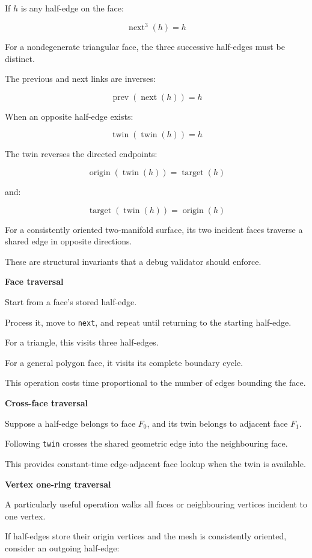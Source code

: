 If \(h\) is any half-edge on the face:

\[
\boxed{ \operatorname{next}^3(h)=h }
\]

For a nondegenerate triangular face, the three successive half-edges must be distinct.

The previous and next links are inverses:

\[
\boxed{ \operatorname{prev}(\operatorname{next}(h))=h }
\]

When an opposite half-edge exists:

\[
\boxed{ \operatorname{twin}(\operatorname{twin}(h))=h }
\]

The twin reverses the directed endpoints:

\[
\operatorname{origin}(\operatorname{twin}(h)) = \operatorname{target}(h)
\]

and:

\[
\operatorname{target}(\operatorname{twin}(h)) = \operatorname{origin}(h)
\]

For a consistently oriented two-manifold surface, its two incident faces traverse a shared edge in opposite directions.

These are structural invariants that a debug validator should enforce.

\textbf{Face traversal}

Start from a face's stored half-edge.

Process it, move to \texttt{next}, and repeat until returning to the starting half-edge.

For a triangle, this visits three half-edges.

For a general polygon face, it visits its complete boundary cycle.

This operation costs time proportional to the number of edges bounding the face.

\textbf{Cross-face traversal}

Suppose a half-edge belongs to face \(F_0\), and its twin belongs to adjacent face \(F_1\).

Following \texttt{twin} crosses the shared geometric edge into the neighbouring face.

This provides constant-time edge-adjacent face lookup when the twin is available.

\textbf{Vertex one-ring traversal}

A particularly useful operation walks all faces or neighbouring vertices incident to one vertex.

If half-edges store their origin vertices and the mesh is consistently oriented, consider an outgoing half-edge:

